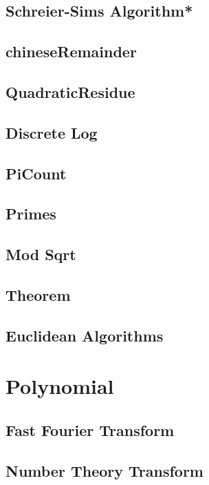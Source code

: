 \subsection{Schreier-Sims Algorithm*} %

\subsection{chineseRemainder}

\subsection{QuadraticResidue}

\subsection{Discrete Log}

\subsection{PiCount}

\subsection{Primes}

\subsection{Mod Sqrt}

\subsection{Theorem}

\subsection{Euclidean Algorithms}


\section{Polynomial}
\subsection{Fast Fourier Transform}

\subsection{Number Theory Transform}

